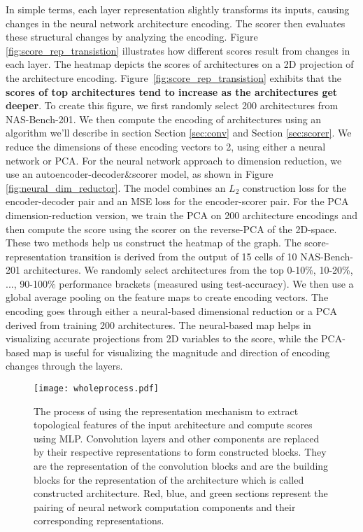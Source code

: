 \documentclass[lettersize,journal]{IEEEtran}
\begin{document}
In simple terms, each layer representation slightly transforms its inputs, causing changes in the neural network architecture encoding. The scorer then evaluates these structural changes by analyzing the encoding. Figure \ref{fig:score_rep_transistion} illustrates how different scores result from changes in each layer. The heatmap depicts the scores of architectures on a 2D projection of the architecture encoding. Figure~\ref{fig:score_rep_transistion} exhibits that the \textbf{scores of top architectures tend to increase as the architectures get deeper}. To create this figure, we first randomly select 200 architectures from NAS-Bench-201. We then compute the encoding of architectures using an algorithm we'll describe in section Section \ref{sec:conv} and Section \ref{sec:scorer}. We reduce the dimensions of these encoding vectors to 2, using either a neural network or PCA. For the neural network approach to dimension reduction, we use an autoencoder-decoder\&scorer model, as shown in Figure \ref{fig:neural_dim_reductor}. The model combines an $L_2$ construction loss for the encoder-decoder pair and an MSE loss for the encoder-scorer pair. For the PCA dimension-reduction version, we train the PCA on 200 architecture encodings and then compute the score using the scorer on the reverse-PCA of the 2D-space. These two methods help us construct the heatmap of the graph. The score-representation transition is derived from the output of 15 cells of 10 NAS-Bench-201 architectures. We randomly select architectures from the top 0-10\%, 10-20\%, ..., 90-100\% performance brackets (measured using test-accuracy). We then use a global average pooling on the feature maps to create encoding vectors. The encoding goes through either a neural-based dimensional reduction or a PCA derived from training 200 architectures. The neural-based map helps in visualizing accurate projections from 2D variables to the score, while the PCA-based map is useful for visualizing the magnitude and direction of encoding changes through the layers.

    \begin{figure*}
        \centering
        \texttt{[image: wholeprocess.pdf]}
        \caption{The process of using the representation mechanism to extract topological features of the input architecture and compute scores using MLP. Convolution layers and other components are replaced by their respective representations to form constructed blocks. They are the representation of the convolution blocks and are the building blocks for the representation of the architecture which is called constructed architecture. Red, blue, and green sections represent the pairing of neural network computation components and their corresponding representations.}
\label{fig:wholeprocess}
    \end{figure*}
    
\end{document}
